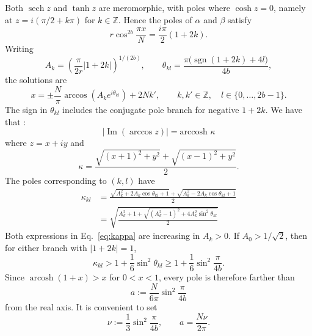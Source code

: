 \documentclass[aps,floatfix,10pt,amssymb,amsfont,amsmath,superscriptaddress,float,nofootinbib,longbibliography,nobalancelastpage,twocolumn]{revtex4-2}
\begin{document}
Both $\operatorname{sech}z$ and $\operatorname{tanh}z$ are meromorphic, with poles where $\cosh z=0$, namely at $z=i(\pi/2+k\pi)$ for $k\in\mathbb{Z}$. Hence the poles of $\alpha$ and $\beta$ satisfy
\begin{equation}
    r\cos^{2b}\frac{\pi x}{N}=\frac{i\pi}{2}(1+2k).
\end{equation}
Writing
\begin{equation}
    A_k=\left(\frac{\pi}{2r}|1+2k|\right)^{\!1/(2b)},\qquad
    \theta_{kl}=\frac{\pi\bigl(\operatorname{sgn}(1+2k)+4l\bigr)}{4b},
\end{equation}
the solutions are
\begin{equation}
    x=\pm\frac{N}{\pi}\arccos\!\left(A_ke^{i\theta_{kl}}\right)+2Nk',
    \qquad k,k'\in\mathbb{Z},\quad l\in\{0,\ldots,2b-1\}.
\end{equation}
The sign in $\theta_{kl}$ includes the conjugate pole branch for negative $1+2k$. We have that \cite[\href{http://dlmf.nist.gov/4.23.E35}{4.23.35}]{NIST:DLMF}:
\begin{equation}
    |\operatorname{Im}(\arccos z)| = \text{arccosh }{\kappa}
\end{equation}
where $z=x+iy$ and
\begin{equation}
    \kappa = \frac{\sqrt{(x+1)^2 + y^2} + \sqrt{(x-1)^2+y^2}}{2}.
\end{equation}
The poles corresponding to $(k,l)$ have
\begin{align}
    \kappa_{kl} &= \frac{\sqrt{A_k^2 + 2A_k\cos\theta_{kl}+1} +\sqrt{A_k^2 - 2A_k\cos\theta_{kl}+1}}{2}\\
    &= \sqrt{\frac{A_k^2+1 + \sqrt{(A_k^2-1)^2+4A_k^2\sin^2\theta_{kl}}}{2}}
    \label{eq:kappa}
\end{align}
Both expressions in Eq.~\eqref{eq:kappa} are increasing in $A_k>0$. If $A_0>1/\sqrt{2}$, then for either branch with $|1+2k|=1$,
\begin{equation}
    \kappa_{kl}>1+\frac{1}{6}\sin^2\theta_{kl}
    \geq 1+\frac{1}{6}\sin^2\frac{\pi}{4b}.
\end{equation}
Since $\operatorname{arcosh}(1+x)>x$ for $0<x<1$, every pole is therefore farther than
\begin{equation}
    a:=\frac{N}{6\pi}\sin^2\frac{\pi}{4b}
\end{equation}
from the real axis. It is convenient to set
\begin{equation}
    \nu:=\frac{1}{3}\sin^2\frac{\pi}{4b},\qquad a=\frac{N\nu}{2\pi}.
\end{equation}
\end{document}
